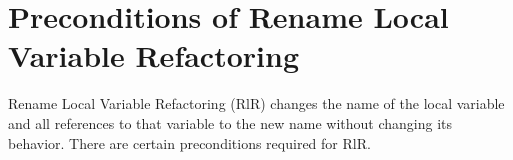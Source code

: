 \section{\textbf{Preconditions of Rename Local Variable Refactoring}}
Rename Local Variable Refactoring (RlR) changes the name of the local variable and all references to that variable to the new name without changing its behavior. There are certain preconditions required for RlR.


